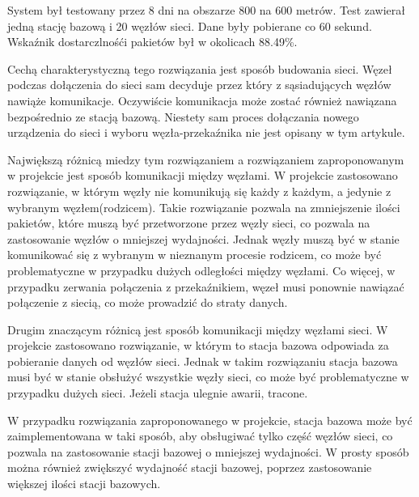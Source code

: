 System był testowany przez 8 dni na obszarze 800 na 600 metrów. Test zawierał jedną stację bazową i 20 węzłów sieci. Dane były pobierane co 60 sekund. Wskaźnik dostarczlnośći pakietów był w okolicach 88.49\%.

Cechą charakterystyczną tego rozwiązania jest sposób budowania sieci. Węzeł podczas dołączenia do sieci sam decyduje przez który z sąsiadujących węzłów nawiąże komunikacje. Oczywiście komunikacja może zostać również nawiązana bezpośrednio ze stacją bazową. Niestety sam proces dołączania nowego urządzenia do sieci i wyboru węzła-przekaźnika nie jest opisany w tym artykule.

Największą różnicą miedzy tym rozwiązaniem a rozwiązaniem zaproponowanym w projekcie jest sposób komunikacji między węzłami. W projekcie zastosowano rozwiązanie, w którym węzły nie komunikują się każdy z każdym, a jedynie z wybranym węzłem(rodzicem). Takie rozwiązanie pozwala na zmniejszenie ilości pakietów, które muszą być przetworzone przez węzły sieci, co pozwala na zastosowanie węzłów o mniejszej wydajności. Jednak węzły muszą być w stanie komunikować się z wybranym w nieznanym procesie rodzicem, co może być problematyczne w przypadku dużych odległości między węzłami. Co więcej, w przypadku zerwania połączenia z przekaźnikiem, węzeł musi ponownie nawiązać połączenie z siecią, co może prowadzić do straty danych.

Drugim znaczącym różnicą jest sposób komunikacji między węzłami sieci. W projekcie zastosowano rozwiązanie, w którym to stacja bazowa odpowiada za pobieranie danych od węzłów sieci. Jednak w takim rozwiązaniu stacja bazowa musi być w stanie obsłużyć wszystkie węzły sieci, co może być problematyczne w przypadku dużych sieci. Jeżeli stacja ulegnie awarii, tracone.

W przypadku rozwiązania zaproponowanego w projekcie, stacja bazowa może być zaimplementowana w taki sposób, aby obsługiwać tylko część węzłów sieci, co pozwala na zastosowanie stacji bazowej o mniejszej wydajności. W prosty sposób można również zwiększyć wydajność stacji bazowej, poprzez zastosowanie większej ilości stacji bazowych.

